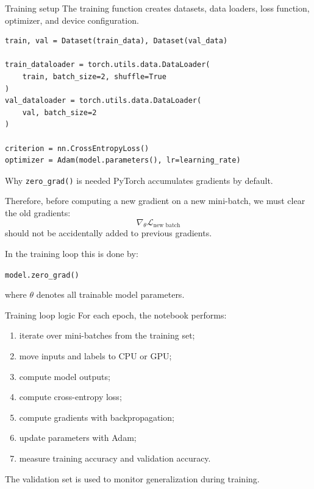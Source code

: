 \documentclass[aspectratio=169]{beamer}
\begin{document}
\begin{frame}[fragile]{Training setup}
The training function creates datasets, data loaders, loss function, optimizer, and device configuration.

\begin{lstlisting}[style=pythonstyle]
train, val = Dataset(train_data), Dataset(val_data)

train_dataloader = torch.utils.data.DataLoader(
    train, batch_size=2, shuffle=True
)
val_dataloader = torch.utils.data.DataLoader(
    val, batch_size=2
)

criterion = nn.CrossEntropyLoss()
optimizer = Adam(model.parameters(), lr=learning_rate)
\end{lstlisting}
\end{frame}

\begin{frame}{Why \texttt{zero\_grad()} is needed}
PyTorch accumulates gradients by default.

\vspace{0.3cm}

Therefore, before computing a new gradient on a new mini-batch, we must clear the old gradients:
\[
\nabla_{\theta} \mathcal{L}_{\text{new batch}}
\]
should not be accidentally added to previous gradients.

\vspace{0.3cm}

In the training loop this is done by:
\begin{center}
\texttt{model.zero\_grad()}
\end{center}
where $\theta$ denotes all trainable model parameters.
\end{frame}

\begin{frame}{Training loop logic}
For each epoch, the notebook performs:
\begin{enumerate}
    \item iterate over mini-batches from the training set;
    \item move inputs and labels to CPU or GPU;
    \item compute model outputs;
    \item compute cross-entropy loss;
    \item compute gradients with backpropagation;
    \item update parameters with Adam;
    \item measure training accuracy and validation accuracy.
\end{enumerate}

\vspace{0.2cm}

The validation set is used to monitor generalization during training.
\end{frame}
\end{document}
